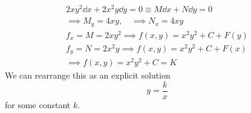 \begin{example}
    \begin{align*}
        2xy^2 \dd{x} + 2x^2 y \dd{y} = 0 \equiv M \dd{x} + N \dd{y} = 0\\
        \implies M_y = 4xy, \quad \implies N_x = 4xy\\
        f_x = M = 2x y^2 \implies f(x, y) = x^2y^2 + C + F(y)\\
        f_y = N = 2x^2y\implies f(x, y) = x^2y^2 + C + F(x)\\
        \implies f(x, y) = x^2y^2 + C = K
    \end{align*}
    We can rearrange this as an explicit solution \[
        y = \frac{k}{x}
    \]
    for some constant $k$.
\end{example}